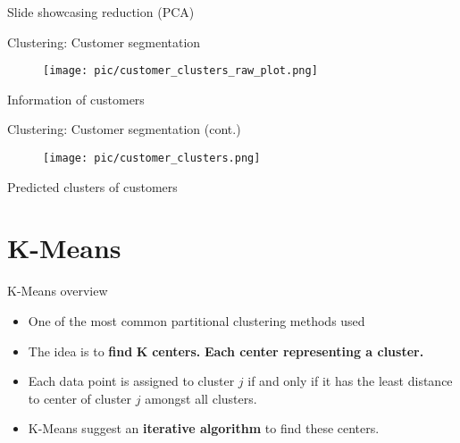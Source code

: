\documentclass[serif, aspectratio=169]{beamer}
\begin{document}
\begin{frame}{Slide showcasing reduction (PCA)}
    
\end{frame}

\begin{frame}{Clustering: Customer segmentation}
    \begin{figure}
        \centering
        \texttt{[image: pic/customer\_clusters\_raw\_plot.png]}
    \end{figure}
    \begin{center}
        Information of customers
    \end{center}
\end{frame}

\begin{frame}{Clustering: Customer segmentation (cont.)}
    \begin{figure}
        \centering
        \texttt{[image: pic/customer\_clusters.png]}
    \end{figure}
    \begin{center}
        Predicted clusters of customers
    \end{center}
\end{frame}


\section{K-Means}
\begin{frame}{K-Means overview}
    \begin{itemize}
        \item One of the most common partitional clustering methods used
        \item The idea is to \textbf{find} \( \mathbf{K} \) \textbf{centers.} \textbf{Each center representing a cluster.}
        \item Each data point is assigned to cluster \( j \) if and only if it has the least distance to center of cluster \( j \) amongst all clusters.
        \item K-Means suggest an \textbf{iterative algorithm} to find these centers.
    \end{itemize}
\end{frame}
\end{document}
